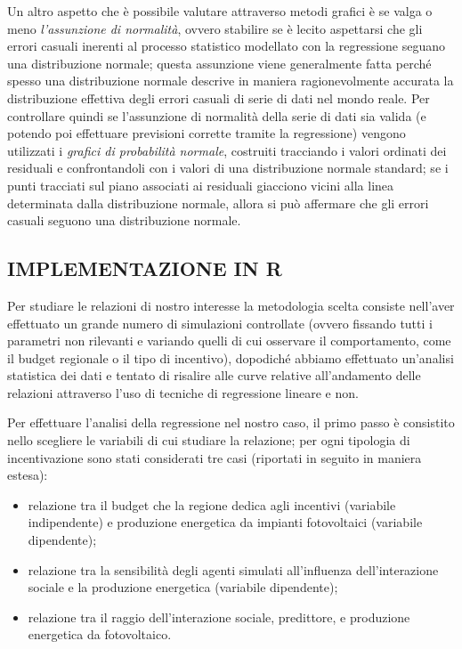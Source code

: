\documentclass[12pt,a4paper,openright,twoside]{report}
\begin{document}
Un altro aspetto che è possibile valutare attraverso metodi grafici è se valga o meno \emph{l'assunzione di normalità}, ovvero stabilire se è lecito aspettarsi che gli errori casuali inerenti al processo statistico modellato con la regressione seguano una distribuzione normale; questa assunzione viene generalmente fatta perché spesso una distribuzione normale descrive in maniera ragionevolmente accurata la distribuzione effettiva degli errori casuali di serie di dati nel mondo reale. Per controllare quindi se l'assunzione di normalità della serie di dati sia valida (e potendo poi effettuare previsioni corrette tramite la regressione) vengono utilizzati i \emph{grafici di probabilità normale}, costruiti tracciando i valori ordinati dei residuali e confrontandoli con i valori di una distribuzione  normale standard; se i punti tracciati sul piano associati ai residuali giacciono vicini alla linea determinata dalla distribuzione normale, allora si può affermare che gli errori casuali seguono una distribuzione normale.


\subsection{IMPLEMENTAZIONE IN R}

Per studiare le relazioni di nostro interesse la metodologia scelta consiste nell'aver effettuato un grande numero di simulazioni controllate (ovvero fissando tutti i parametri non rilevanti e variando quelli di cui osservare il comportamento, come il budget regionale o il tipo di incentivo), dopodiché abbiamo effettuato un'analisi statistica dei dati e tentato di risalire alle curve relative all'andamento delle relazioni attraverso l'uso di tecniche di regressione lineare e non.

Per effettuare l'analisi della regressione nel nostro caso, il primo passo è consistito nello scegliere le variabili di cui studiare la relazione; per ogni tipologia di incentivazione sono stati considerati tre casi (riportati in seguito in maniera estesa):
\begin{itemize}
\item relazione tra il budget che la regione dedica agli incentivi (variabile indipendente) e produzione energetica da impianti fotovoltaici (variabile dipendente);
\item relazione tra la sensibilità degli agenti simulati all'influenza dell'interazione sociale e la produzione energetica (variabile dipendente);
\item relazione tra il raggio dell'interazione sociale, predittore, e produzione energetica da fotovoltaico.
\end{itemize}
\end{document}
